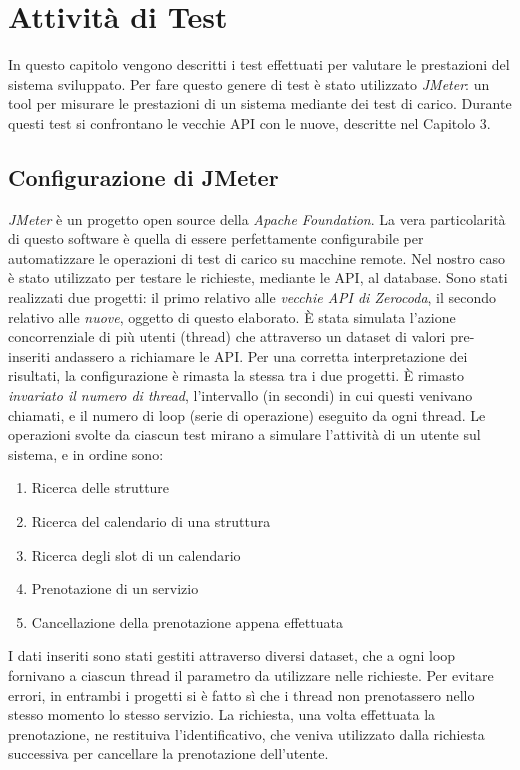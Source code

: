 \chapter{Attività di Test}
\label{chap:testing}
In questo capitolo vengono descritti i test effettuati per valutare le prestazioni del sistema sviluppato. Per fare questo genere di test è stato utilizzato \emph{JMeter}: un tool per misurare le prestazioni di un sistema mediante dei test di carico. Durante questi test si confrontano le vecchie API con le nuove, descritte nel Capitolo 3.

\section{Configurazione di JMeter}
\emph{JMeter} è un progetto open source della \emph{Apache Foundation}. La vera particolarità di questo software è quella di essere perfettamente configurabile per automatizzare le operazioni di test di carico su macchine remote. Nel nostro caso è stato utilizzato per testare le richieste, mediante le API, al database. Sono stati realizzati due progetti: il primo relativo alle \textit{vecchie API di Zerocoda}, il secondo relativo alle \textit{nuove}, oggetto di questo elaborato. È stata simulata l'azione concorrenziale di più utenti (thread) che attraverso un dataset di valori pre-inseriti andassero a richiamare le API. Per una corretta interpretazione dei risultati, la configurazione è rimasta la stessa tra i due progetti. È rimasto \textit{invariato il numero di thread}, l'intervallo (in secondi) in cui questi venivano chiamati, e il numero di loop (serie di operazione) eseguito da ogni thread. Le operazioni svolte da ciascun test mirano a simulare l'attività di un utente sul sistema, e in ordine sono:
\begin{enumerate}
    \item Ricerca delle strutture
    \item Ricerca del calendario di una struttura
    \item Ricerca degli slot di un calendario
    \item Prenotazione di un servizio
    \item Cancellazione della prenotazione appena effettuata
\end{enumerate}
I dati inseriti sono stati gestiti attraverso diversi dataset, che a ogni loop fornivano a ciascun thread il parametro da utilizzare nelle richieste. Per evitare errori, in entrambi i progetti si è fatto sì che i thread non prenotassero nello stesso momento lo stesso servizio. La richiesta, una volta effettuata la prenotazione, ne restituiva l'identificativo, che veniva utilizzato dalla richiesta successiva per cancellare la prenotazione dell'utente.

